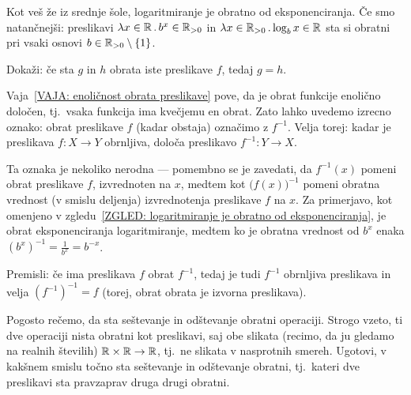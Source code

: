                 \begin{zgled}\label{ZGLED: logaritmiranje je obratno od eksponenciranja}
                        Kot veš že iz srednje šole, logaritmiranje je obratno od eksponenciranja. Če smo natančnejši: preslikavi $\xlam{x}[\RR]{b^x}[\RR_{> 0}]$ in $\xlam{x}[\RR_{>0}]{\log_b x}[\RR]$ sta si obratni pri vsaki osnovi $b \in \RR_{> 0} \setminus \set{1}$.
                \end{zgled}

                \begin{vaja}\label{VAJA: enoličnost obrata preslikave}
                        Dokaži: če sta $g$ in $h$ obrata iste preslikave $f$, tedaj $g = h$.
                \end{vaja}

                Vaja~\ref{VAJA: enoličnost obrata preslikave} pove, da je obrat funkcije enolično določen, tj.~vsaka funkcija ima kvečjemu en obrat. Zato lahko uvedemo izrecno oznako: obrat preslikave $f$ (kadar obstaja) označimo z $f^{-1}$. Velja torej: kadar je preslikava $f\colon X \to Y$ obrnljiva, določa preslikavo $f^{-1}\colon Y \to X$.

                Ta oznaka je nekoliko nerodna --- pomembno se je zavedati, da $f^{-1}(x)$ pomeni obrat preslikave $f$, izvrednoten na $x$, medtem kot $\big(f(x)\big)^{-1}$ pomeni obratna vrednost (v smislu deljenja) izvrednotenja preslikave $f$ na $x$. Za primerjavo, kot omenjeno v zgledu~\ref{ZGLED: logaritmiranje je obratno od eksponenciranja}, je obrat eksponenciranja logaritmiranje, medtem ko je obratna vrednost od $b^x$ enaka $(b^x)^{-1} = \frac{1}{b^x} = b^{-x}$.

                \begin{vaja}
                        Premisli: če ima preslikava $f$ obrat $f^{-1}$, tedaj je tudi $f^{-1}$ obrnljiva preslikava in velja $(f^{-1})^{-1} = f$ (torej, obrat obrata je izvorna preslikava).
                \end{vaja}

                \begin{vaja}
                        Pogosto rečemo, da sta seštevanje in odštevanje obratni operaciji. Strogo vzeto, ti dve operaciji nista obratni kot preslikavi, saj obe slikata (recimo, da ju gledamo na realnih številih) $\mathbb{R} \times \mathbb{R} \to \mathbb{R}$, tj.~ne slikata v nasprotnih smereh. Ugotovi, v kakšnem smislu točno sta seštevanje in odštevanje obratni, tj.~kateri dve preslikavi sta pravzaprav druga drugi obratni.
                \end{vaja}

